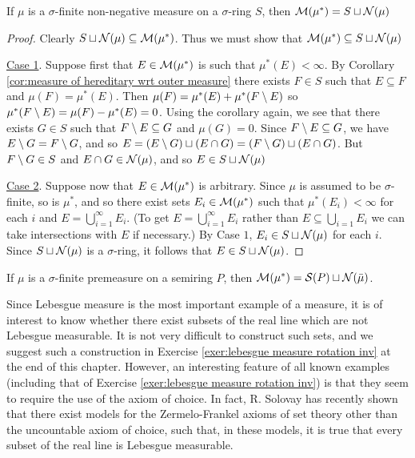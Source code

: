 \begin{theorem}
\label{thm:null set completion sigma finite}
If $\mu$ is a $\sigma$-finite non-negative measure on a $\sigma$-ring $S$, then ${\cal M}(\mu^*)=S \sqcup {\cal N}(\mu)$
\end{theorem}

\begin{proof}
Clearly ${S} \sqcup {\cal N}(\mu) \subseteq {\cal M}(\mu^*)$. Thus we must show that ${\cal M}(\mu^*) \subseteq S\sqcup {\cal N}(\mu)$

\underline{Case 1}. Suppose first that $E \in {\cal M}(\mu^*)$ is such that $\mu^*(E)<\infty$. By Corollary \ref{cor:measure of hereditary wrt outer measure} there exists $F \in S$ such that $E \subseteq F$ and $\mu(F)=\mu^*(E)$. Then $\mu(F)=\mu^*(E)+\mu^*(F\setminus E)$ so $\mu^*(F\setminus E)=\mu(F)-\mu^*(E)=0$. Using the corollary again, we see that there exists $G \in S$ such that $F\setminus E\subseteq G$ and $\mu(G)=0$. Since $F\setminus E\subseteq G$, we have $E\setminus G=F\setminus G$, and so $E=(E\setminus G) \sqcup(E\cap G)=(F\setminus G)\sqcup(E\cap G)$. But $F\setminus G\in S$ and $E\cap G\in {\cal N}(\mu)$, and so $E\in S\sqcup {\cal N}(\mu)$

\underline{Case 2}. Suppose now that $E \in {\cal M}(\mu^*)$ is arbitrary. Since $\mu$ is assumed to be $\sigma$-finite, so is $\mu^*$, and so there exist sets $E_i \in {\cal M}(\mu^*)$ such that $\mu^*(E_i)<\infty$ for each $i$ and $E=\bigcup_{i=1}^\infty E_i .$ (To get $E=\bigcup_{i=1}^\infty E_i$ rather than $E \subseteq \bigcup_{i=1} E_i$ we can take intersections with $E$ if necessary.) By Case $1$, $E_i \in {S} \sqcup{\cal N}(\mu)$ for each $i$. Since $S \sqcup {\cal N}(\mu)$ is a $\sigma$-ring, it follows that $E\in S\sqcup{\cal N}(\mu)$.
\end{proof}

\begin{corollary}
If $\mu$ is a $\sigma$-finite premeasure on a semiring $P$, then ${\cal M}(\mu^*)={\cal S}(P) \sqcup{\cal N}(\bar{\mu})$.
\end{corollary}

Since Lebesgue measure is the most important example of a measure, it is of interest to know whether there exist subsets of the real line which are not Lebesgue measurable. It is not very difficult to construct such sets, and we suggest such a construction in Exercise \ref{exer:lebesgue measure rotation inv} at the end of this chapter. However, an interesting feature of all known examples (including that of Exercise \ref{exer:lebesgue measure rotation inv}) is that they seem to require the use of the axiom of choice. In fact, R. Solovay has recently shown that there exist models for the Zermelo-Frankel axioms of set theory other than the uncountable axiom of choice, such that, in these models, it is true that every subset of the real line is Lebesgue measurable.

